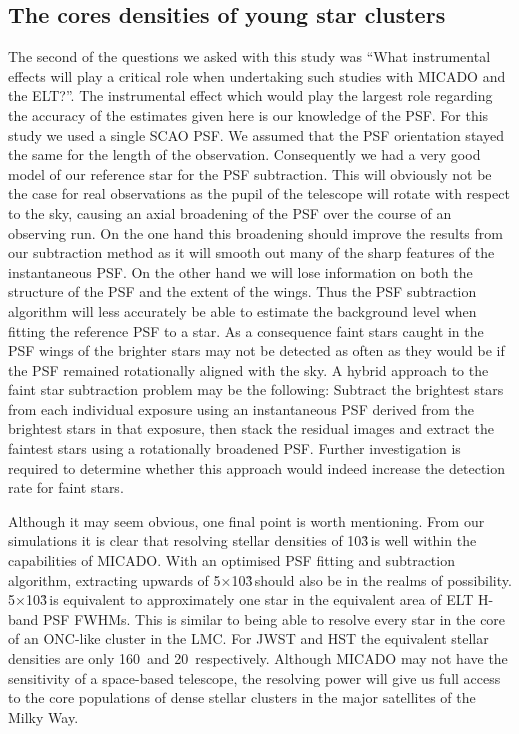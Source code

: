 \subsection{The cores densities of young star clusters}

The second of the questions we asked with this study was ``What instrumental effects will play a critical role when undertaking such studies with MICADO and the ELT?''. The instrumental effect which would play the largest role regarding the accuracy of the estimates given here is our knowledge of the PSF. For this study we used a single SCAO PSF. We assumed that the PSF orientation stayed the same for the length of the observation. Consequently we had a very good model of our reference star for the PSF subtraction. This will obviously not be the case for real observations as the pupil of the telescope will rotate with respect to the sky, causing an axial broadening of the PSF over the course of an observing run. On the one hand this broadening should improve the results from our subtraction method as it will smooth out many of the sharp features of the instantaneous PSF. On the other hand we will lose information on both the structure of the PSF and the extent of the wings. Thus the PSF subtraction algorithm will less accurately be able to estimate the background level when fitting the reference PSF to a star. As a consequence faint stars caught in the PSF wings of the brighter stars may not be detected as often as they would be if the PSF remained rotationally aligned with the sky. A hybrid approach to the faint star subtraction problem may be the following: Subtract the brightest stars from each individual exposure using an instantaneous PSF derived from the brightest stars in that exposure, then stack the residual images and extract the faintest stars using a rotationally broadened PSF. Further investigation is required to determine whether this approach would indeed increase the detection rate for faint stars.

Although it may seem obvious, one final point is worth mentioning. From our simulations it is clear that resolving stellar densities of 10\h3\,\spa is well within the capabilities of MICADO. With an optimised PSF fitting and subtraction algorithm, extracting upwards of 5$\times$10\h3\,\spa should also be in the realms of possibility. 5$\times$10\h3\,\spa is equivalent to approximately one star in the equivalent area of  ELT H-band PSF FWHMs. This is similar to being able to resolve every star in the core of an ONC-like cluster in the LMC. For JWST and HST the equivalent stellar densities are only 160~\spa and 20~\spa respectively. Although MICADO may not have the sensitivity of a space-based telescope, the resolving power will give us full access to the core populations of dense stellar clusters in the major satellites of the Milky Way.

